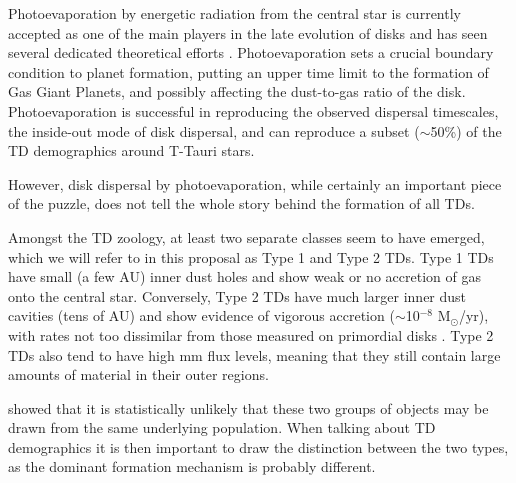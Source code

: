 \documentclass[10pt,fleqn,twoside,a4paper]{article}
\begin{document}
Photoevaporation by energetic radiation from the central star is currently accepted as one of
the main players in the late evolution of disks and has seen several
dedicated theoretical efforts 
\citep[e.g.,][]{2001MNRAS.328..485C, 2006MNRAS.369..216A, 2008ApJ...688..398E,
2009ApJ...699.1639E, 2010MNRAS.401.1415O, 2011MNRAS.412...13O, 2012MNRAS.422.1880O,
2009ApJ...690.1539G, 2009ApJ...705.1237G, 2015ApJ...804...29G}.
Photoevaporation sets a crucial boundary condition to planet formation, 
putting an upper time limit to the formation of Gas Giant Planets, and 
possibly affecting the dust-to-gas ratio of the disk.
Photoevaporation is
successful in reproducing the observed dispersal timescales, the
inside-out mode of disk dispersal, and can reproduce a subset
($\sim$50\%) of the TD demographics around T-Tauri stars.

However, disk dispersal by photoevaporation, while certainly an important piece of the
puzzle, does not tell the whole story behind the formation of all
TDs. 

\begin{highlight}
Amongst the TD zoology, at least two separate classes seem
to have emerged, which we will refer to in this proposal as Type 1 and
Type 2 TDs. Type 1 TDs have small (a few AU) inner dust holes and show weak or no accretion of
gas onto the central star. Conversely, Type
2 TDs have much larger inner dust cavities (tens of AU) and show evidence of vigorous accretion ($\sim$10$^{-8}$
M$_{\odot}$/yr), with rates not too dissimilar from those measured
on primordial disks \citep[e.g.,][]{2014A&A...568A..18M}.
Type 2 TDs also tend to have high mm flux levels, meaning that
they still contain large amounts of material in their outer
regions. 
\end{highlight}
\citet{2012MNRAS.426L..96O} showed that it is statistically
unlikely that these two groups of objects may be drawn from the same
underlying population. When talking about TD demographics it is then
important to draw the distinction between the two types, as the
dominant formation mechanism is probably different. 
\end{document}
